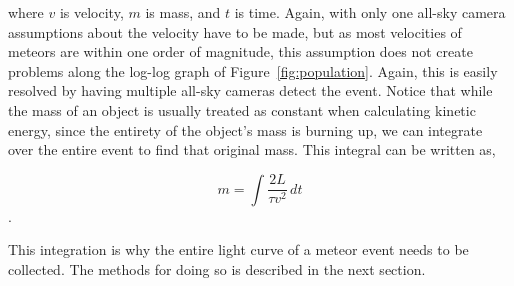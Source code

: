 where $v$ is velocity, $m$ is mass, and $t$ is time. Again, with only one all-sky camera assumptions about the velocity have to be made, but as most velocities of meteors are within one order of magnitude, this assumption does not create problems along the log-log graph of Figure~\ref{fig:population}. Again, this is easily resolved by having multiple all-sky cameras detect the event. Notice that while the mass of an object is usually treated as constant when calculating kinetic energy, since the entirety of the object's mass is burning up, we can integrate over the entire event to find that original mass. This integral can be written as,

\begin{equation}
m =\int \frac{2L}{\tau v^2}\,dt
\end{equation}.

This integration is why the entire light curve of a meteor event needs to be collected. The methods for doing so is described in the next section.
